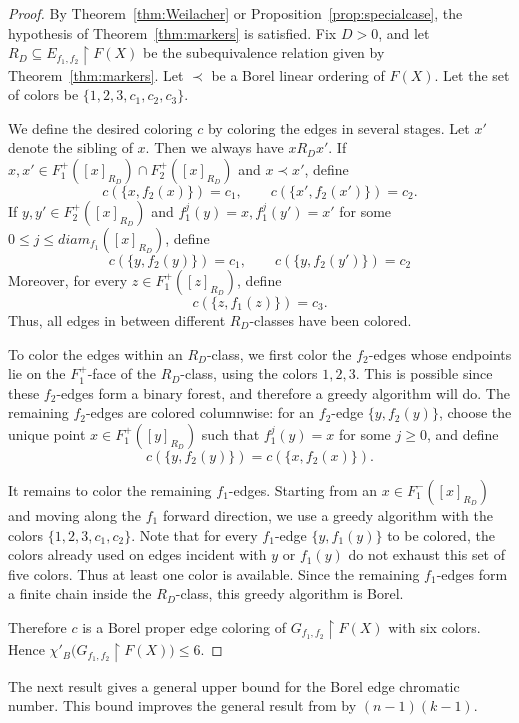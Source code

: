 \documentclass[11pt, reqno, a4paper]{amsart}
\theoremstyle{definition}
\theoremstyle{plain}
\begin{document}
\begin{proof}
By Theorem~\ref{thm:Weilacher} or Proposition~\ref{prop:specialcase}, the hypothesis of
Theorem~\ref{thm:markers} is satisfied. Fix $D>0$, and let
$R_D\subseteq E_{f_1,f_2}\upharpoonright F(X)$
be the subequivalence relation given by Theorem~\ref{thm:markers}. Let $\prec$ be a Borel linear ordering of $F(X)$. Let the set
of colors be
$\{1,2,3,c_1,c_2,c_3\}$.

We define the desired coloring $c$ by coloring the edges in several stages.
Let $x'$ denote the sibling of $x$. Then we always have $xR_Dx'$. If
$x,x'\in F_1^+([x]_{R_D})\cap F_2^+([x]_{R_D})$
and $x\prec x'$, define
$$
c(\{x,f_2(x)\})=c_1,
\qquad
c(\{x',f_2(x')\})=c_2.
$$
If
$y,y'\in F_2^+([x]_{R_D})$ and $f_1^j(y)=x,f_1^j(y')=x'$ for some $0\le j\le diam_{f_1}([x]_{R_D})$, define
$$
c(\{y,f_2(y)\})=c_1,\qquad
c(\{y,f_2(y')\})=c_2
$$
Moreover, for every
$z\in F_1^+([z]_{R_D})$,
define
$$
c(\{z,f_1(z)\})=c_3.
$$
Thus, all edges in between different $R_D$-classes have been colored. 

To color the edges within an $R_D$-class, we first color the $f_2$-edges whose endpoints lie on the
$F_1^+$-face of the $R_D$-class, using the colors $1,2,3$. This is possible since these $f_2$-edges form a binary forest, and therefore a greedy algorithm will do. The
remaining $f_2$-edges are colored columnwise: for an $f_2$-edge
$\{y,f_2(y)\}$, choose the unique point
$x\in F_1^+([y]_{R_D})$
such that $f_1^j(y)=x$ for some $j\ge 0$, and define
$$
c(\{y,f_2(y)\})=c(\{x,f_2(x)\}).
$$

It remains to color the remaining $f_1$-edges. Starting from an $x\in F_1^-([x]_{R_D})$ and moving along the $f_1$ forward direction, we use a greedy algorithm with the colors
$\{1,2,3,c_1,c_2\}$. Note that for every $f_1$-edge $\{y,f_1(y)\}$ to be colored, the colors already used on
edges incident with $y$ or $f_1(y)$ do not exhaust this set of five colors.
Thus at least one color is available. Since the remaining $f_1$-edges form
a finite chain inside the $R_D$-class, this greedy algorithm is Borel.

Therefore $c$ is a Borel proper edge coloring of
$G_{f_1,f_2}\upharpoonright F(X)$ with six colors. Hence
$\chi'_B\bigl(G_{f_1,f_2}\upharpoonright F(X)\bigr)\le 6$.
\end{proof}

The next result gives a general upper bound for the Borel edge chromatic number. This bound improves the general result from \cite{KechrisSoleckiTodorcevic1999} by $(n-1)(k-1)$. 
\end{document}
